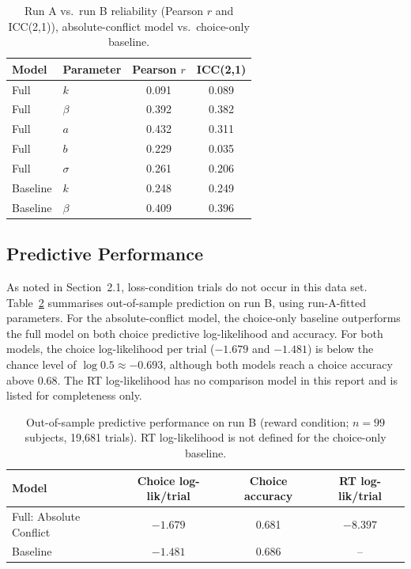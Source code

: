 \documentclass[11pt,a4paper]{article}
\begin{document}
	\begin{table}[htbp]
		\centering
		\begin{tabular}{llcc}
			\toprule
			Model & Parameter & Pearson $r$ & ICC(2,1) \\
			\midrule
			Full     & $k$      & 0.091 & 0.089 \\
			Full     & $\beta$  & 0.392 & 0.382 \\
			Full     & $a$      & 0.432 & 0.311 \\
			Full     & $b$      & 0.229 & 0.035 \\
			Full     & $\sigma$ & 0.261 & 0.206 \\
			Baseline & $k$      & 0.248 & 0.249 \\
			Baseline & $\beta$  & 0.409 & 0.396 \\
			\bottomrule
		\end{tabular}
		\caption{Run A vs.\ run B reliability (Pearson $r$ and ICC(2,1)), absolute-conflict model vs.\ choice-only baseline.}
		\label{tab:reliability}
	\end{table}
	
	\subsection{Predictive Performance}
	
	As noted in Section~2.1, loss-condition trials do not occur in this data set. Table~\ref{tab:prediction} summarises out-of-sample prediction on run B, using run-A-fitted parameters. For the absolute-conflict model, the choice-only baseline outperforms the full model on both choice predictive log-likelihood and accuracy. For both models, the choice log-likelihood per trial ($-1.679$ and $-1.481$) is below the chance level of $\log 0.5\approx-0.693$, although both models reach a choice accuracy above 0.68. The RT log-likelihood has no comparison model in this report and is listed for completeness only.
	
	\begin{table}[htbp]
		\centering
		\begin{tabular}{lccc}
			\toprule
			Model & Choice log-lik/trial & Choice accuracy & RT log-lik/trial \\
			\midrule
			Full: Absolute Conflict & $-1.679$ & 0.681 & $-8.397$ \\
			Baseline & $-1.481$ & 0.686 & -- \\
			\bottomrule
		\end{tabular}
		\caption{Out-of-sample predictive performance on run B (reward condition; $n=99$ subjects, 19{,}681 trials). RT log-likelihood is not defined for the choice-only baseline.}
		\label{tab:prediction}
	\end{table}
	
\end{document}

